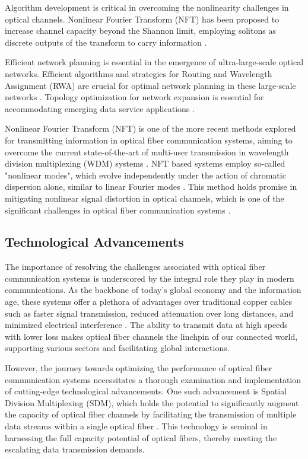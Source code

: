 Algorithm development is critical in overcoming the nonlinearity challenges in optical channels. Nonlinear Fourier Transform (NFT) has been proposed to increase channel capacity beyond the Shannon limit, employing solitons as discrete outputs of the transform to carry information \cite{nature2023}.

Efficient network planning is essential in the emergence of ultra-large-scale optical networks. Efficient algorithms and strategies for Routing and Wavelength Assignment (RWA) are crucial for optimal network planning in these large-scale networks \cite{huawei2023}. Topology optimization for network expansion is essential for accommodating emerging data service applications \cite{huawei2023}.

Nonlinear Fourier Transform (NFT) is one of the more recent methods explored for transmitting information in optical fiber communication systems, aiming to overcome the current state-of-the-art of multi-user transmission in wavelength division multiplexing (WDM) systems \cite{mdpi2023}. NFT based systems employ so-called "nonlinear modes", which evolve independently under the action of chromatic dispersion alone, similar to linear Fourier modes \cite{aps2023}. This method holds promise in mitigating nonlinear signal distortion in optical channels, which is one of the significant challenges in optical fiber communication systems \cite{aps2023}.

\subsection*{Technological Advancements}

The importance of resolving the challenges associated with optical fiber communication systems is underscored by the integral role they play in modern communications. As the backbone of today's global economy and the information age, these systems offer a plethora of advantages over traditional copper cables such as faster signal transmission, reduced attenuation over long distances, and minimized electrical interference \cite{cambridge2022, aip2022}. The ability to transmit data at high speeds with lower loss makes optical fiber channels the linchpin of our connected world, supporting various sectors and facilitating global interactions. 

However, the journey towards optimizing the performance of optical fiber communication systems necessitates a thorough examination and implementation of cutting-edge technological advancements. One such advancement is Spatial Division Multiplexing (SDM), which holds the potential to significantly augment the capacity of optical fiber channels by facilitating the transmission of multiple data streams within a single optical fiber \cite{engineering2023}. This technology is seminal in harnessing the full capacity potential of optical fibers, thereby meeting the escalating data transmission demands.

